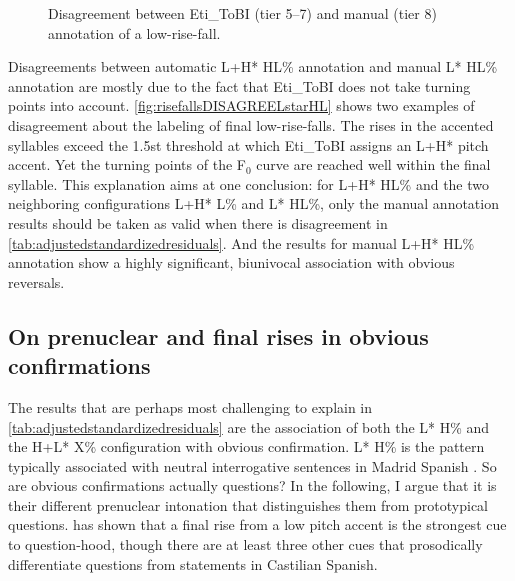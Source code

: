 \begin{sidewaysfigure}
	\centering
	\hspace{2em}%
	\caption[Disagreement between Eti\_ToBI (tier 5--7) and manual (tier 8) annotation of a low-rise-fall]{Disagreement between Eti\_ToBI (tier 5--7) and manual (tier 8) annotation of a low-rise-fall.}\label{fig:risefallsDISAGREELstarHL}
\end{sidewaysfigure}

Disagreements between automatic L+H* HL\% annotation and manual L* HL\% annotation are mostly due to the fact that Eti\_ToBI does not take turning points into account. \autoref{fig:risefallsDISAGREELstarHL} shows two examples of disagreement about the labeling of final low-rise-falls. The rises in the accented syllables exceed the 1.5st threshold at which Eti\_ToBI assigns an L+H* pitch accent. Yet the turning points of the F$_0$ curve are reached well within the final syllable. This explanation aims at one conclusion: for L+H* HL\% and the two neighboring configurations L+H* L\% and L* HL\%, only the manual annotation results should be taken as valid when there is disagreement in \autoref{tab:adjustedstandardizedresiduals}. And the results for manual L+H* HL\% annotation show a highly significant, biunivocal association with obvious reversals. 

\subsection{On prenuclear and final rises in obvious confirmations}
\label{ch:6.3.4}

The results that are perhaps most challenging to explain in \autoref{tab:adjustedstandardizedresiduals} are the association of both the L* H\% and the H+L* X\% configuration with obvious confirmation. L* H\% is the pattern typically associated with neutral interrogative sentences in Madrid Spanish \citep{EscandellVidal.1998,EscandellVidal.1999}. So are obvious confirmations actually questions? In the following, I argue that it is their different prenuclear intonation that distinguishes them from prototypical questions. \citet{Face2007} has shown that a final rise from a low pitch accent is the strongest cue to question-hood, though there are at least three other cues that prosodically differentiate questions from statements in Castilian Spanish.

